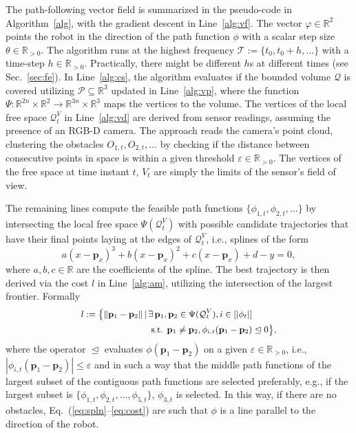 \documentclass[lettersize,journal,twoside]{IEEEtran}
\theoremstyle{definition}
\begin{document}
The path-following vector field is summarized in the pseudo-code in Algorithm~\ref{alg}, with the gradient descent in Line~\ref{alg:vf}. The vector $\varphi\in\mathbb{R}^2$ points the robot in the direction of the path function $\phi$ with a scalar step size $\theta\in\mathbb{R}_{>0}$. The algorithm runs at the highest frequency $\mathcal{T}:=\{t_0,t_0+h,\dots\}$ with a time-step $h\in\mathbb{R}_{>0}$. Practically, there might be different $h$s at different times (see Sec.~\ref{sec:fe}). In Line~\ref{alg:cs}, the algorithm evaluates if the bounded volume $\mathcal{Q}$ is covered utilizing $\mathcal{P}\subseteq\mathbb{R}^3$ updated in Line~\ref{alg:vp}, where the function $\Psi:\mathbb{R}^{2n}\times\mathbb{R}^2\rightarrow\mathbb{R}^{3n}\times\mathbb{R}^3$ maps the vertices to the volume. The vertices of the local free space $\mathcal{Q}^V_t$ in Line~\ref{alg:vd} are derived from sensor readings, assuming the presence of an RGB-D camera. The %
approach reads the camera's point cloud, clustering the obstacles $O_{1,t},O_{2,t},\dots$ by checking if the distance between consecutive points in space is within a given threshold $\varepsilon\in\mathbb{R}_{>0}$. The vertices of the free space at time instant $t$, $V_t$ are simply the limits of the sensor's field of view.

The remaining lines %
compute the feasible path functions $\{\phi_{1,t},\phi_{2,t},\dots\}$ by intersecting the local free space $\Psi(\mathcal{Q}^V_t)$ with possible candidate trajectories that have their final points laying at the edges of $\mathcal{Q}^V_t$, i.e., splines of the form
\begin{equation}\label{eq:spln}
  a(x-\mathbf{p}_x)^3+b(x-\mathbf{p}_x)^2+c(x-\mathbf{p}_x)+d-y=0,
\end{equation}
where $a,b,c\in\mathbb{R}$ are the coefficients of the spline. 
The best trajectory is then derived via the cost $l$ in Line~\ref{alg:am}, utilizing the intersection of the largest frontier. Formally
\begin{equation}\label{eq:cost}\small\begin{split} 
  l:=\bigl\{\lVert \mathbf{p}_1-\mathbf{p}_2\rVert\,|\,&\exists\,\mathbf{p}_1,\mathbf{p}_2\in\Psi(\mathcal{Q}_t^V),i\in[|\phi_t|]\\
  &\text{ s.t. }\mathbf{p}_1\neq\mathbf{p}_2,\phi_{i,t}(\mathbf{p}_1-\mathbf{p}_2)\trianglelefteq 0\bigr\},
\end{split}\end{equation}
where the operator $\trianglelefteq$ evaluates $\phi(\mathbf{p}_1-\mathbf{p}_2)$ on a given $\varepsilon\in\mathbb{R}_{>0}$, i.e., $|\phi_{i,t}(\mathbf{p}_1-\mathbf{p}_2)|\leq\varepsilon$ and in such a way that the middle path functions of the largest subset of the contiguous path functions are selected preferably, e.g., if the largest subset is $\{\phi_{1,t},\phi_{2,t},\dots,\phi_{5,t}\}$, $\phi_{3,t}$ is selected.
In this way, if there are no obstacles, Eq.~(\ref{eq:spln}--\ref{eq:cost}) are such that $\phi$ is a line parallel to the direction of the robot. 
\end{document}

